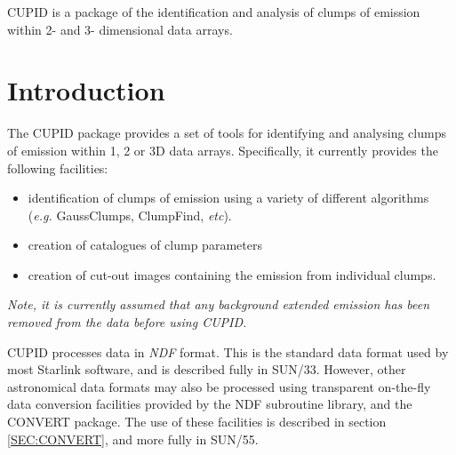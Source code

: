 \documentclass[twoside,11pt]{article}
\newcommand{\stardocinitials}  {SUN}
\newcommand{\stardocnumber}    {255.1}
\newcommand{\stardocabstract}  {CUPID is a package of the identification
and analysis of clumps of emission within 2- and 3- dimensional 
data arrays.}
\newcommand{\stardocname}{\stardocinitials /\stardocnumber}
\newcommand{\hyperref}[4]{#2\ref{#4}#3}
\newenvironment{latexonly}{}{}
\newcommand{\xref}[3]{#1}
\newcommand{\xlabel}[1]{}
\renewcommand{\_}{\texttt{\symbol{95}}}
\renewcommand{\thepage}{\roman{page}}
\begin{document}
\stardocabstract

  \newpage
  \begin{latexonly}
    \setlength{\parskip}{0mm}
    \tableofcontents
    \setlength{\parskip}{\medskipamount}
    \markboth{\stardocname}{\stardocname}
  \end{latexonly}
\cleardoublepage
\renewcommand{\thepage}{\arabic{page}}
\setcounter{page}{1}

\section{\xlabel{introduction}Introduction}

The CUPID package provides a set of tools for identifying and analysing
clumps of emission within 1, 2 or 3D data arrays. Specifically, it currently
provides the following facilities:

\begin{itemize}
\item identification of clumps of emission using a variety of different
      algorithms (\emph{e.g.} GaussClumps, ClumpFind, \emph{etc}).
\item creation of catalogues of clump parameters
\item creation of cut-out images containing the emission from individual clumps.
\end{itemize}

\begin{center}
\emph{Note, it is currently assumed that any background extended emission has
been removed from the data before using CUPID.}
\end{center}

CUPID processes data in \emph{NDF} format. This is the standard data
format used by most Starlink software, and is described fully in
\xref{SUN/33}{sun33}{}. However, other astronomical data formats may also
be processed using transparent on-the-fly data conversion facilities
provided by the NDF subroutine library, and the CONVERT package. The use of 
these facilities is described \hyperref{here}{in section }{}{SEC:CONVERT},
and more fully in \xref{SUN/55}{sun55}{}.
\end{document}
